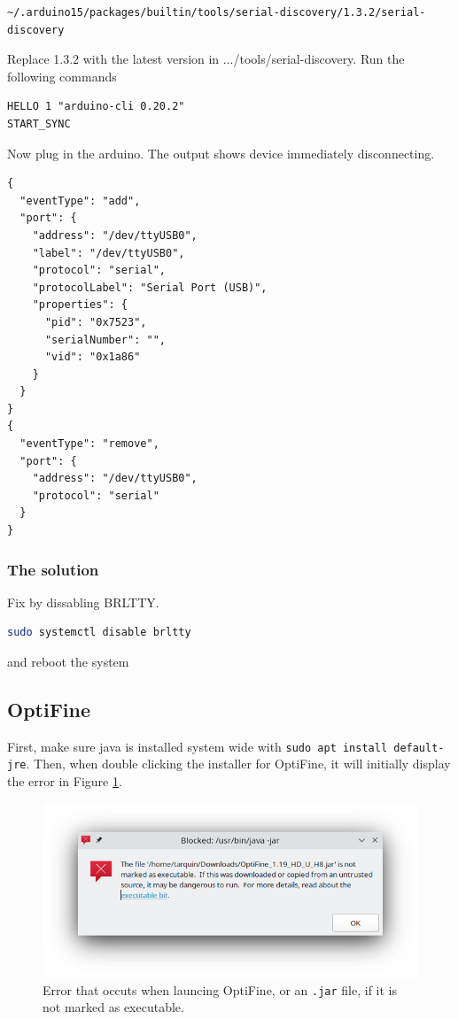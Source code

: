 \documentclass[a4paper, 12pt]{article}
\begin{document}
\begin{lstlisting}
~/.arduino15/packages/builtin/tools/serial-discovery/1.3.2/serial-discovery
\end{lstlisting}

Replace 1.3.2 with the latest version in .../tools/serial-discovery.
Run the following commands

\begin{lstlisting}
HELLO 1 "arduino-cli 0.20.2"
START_SYNC    
\end{lstlisting}

Now plug in the arduino.
The output shows device immediately disconnecting.

\begin{lstlisting}
{
  "eventType": "add",
  "port": {
    "address": "/dev/ttyUSB0",
    "label": "/dev/ttyUSB0",
    "protocol": "serial",
    "protocolLabel": "Serial Port (USB)",
    "properties": {
      "pid": "0x7523",
      "serialNumber": "",
      "vid": "0x1a86"
    }
  }
}
{
  "eventType": "remove",
  "port": {
    "address": "/dev/ttyUSB0",
    "protocol": "serial"
  }
}
\end{lstlisting}

\subsubsection{The solution}

Fix by dissabling BRLTTY.

\begin{lstlisting}[language=Bash]
sudo systemctl disable brltty
\end{lstlisting}

and reboot the system

\subsection{OptiFine}

First, make sure java is installed system wide with \texttt{sudo apt install default-jre}. Then, when
double clicking the installer for OptiFine, it will initially display the error in Figure \ref{fig:optifine}.

\begin{figure}[h]
 \centering
 \includegraphics[width=0.6\linewidth]{images/optifine}
 \caption{Error that occuts when launcing OptiFine, or an \texttt{.jar} file, if it is not marked as executable.}
 \label{fig:optifine}
\end{figure}
\end{document}
